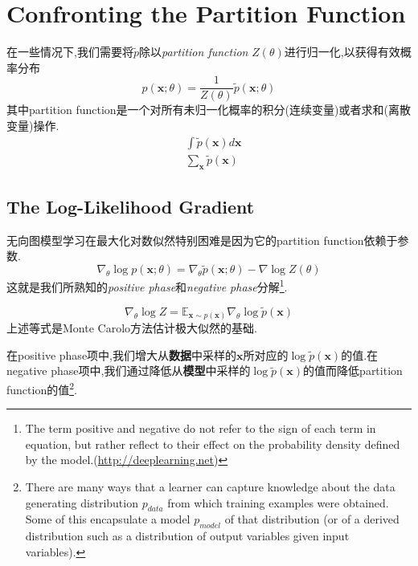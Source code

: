 \chapter{Confronting the Partition Function}

在一些情况下,我们需要将$\tilde p$除以\textit{partition function} $Z(\theta)$进行归一化,以获得有效概率分布
\begin{equation}
p(\mathbf x;\theta)=\frac{1}{Z(\theta)}\tilde p(\mathbf x;\theta)
\end{equation}
其中partition function是一个对所有未归一化概率的积分(连续变量)或者求和(离散变量)操作.
\begin{equation}\begin{split}
&\int\tilde p(\mathbf x)d\mathbf x\\
&\sum_{\mathbf x}\tilde p(\mathbf x)
\end{split}\end{equation}

\section{The Log-Likelihood Gradient}

无向图模型学习在最大化对数似然特别困难是因为它的partition function依赖于参数.
\begin{equation}
\nabla_\theta\log p(\mathbf x;\theta)=\nabla_\theta\tilde p(\mathbf x;\theta)-\nabla\log Z(\theta)
\end{equation}
这就是我们所熟知的\textit{positive phase}和\textit{negative phase}分解\footnote{The term positive and negative do not refer to the sign of each term in equation, but rather reflect to their effect on the probability density defined by the model.(\href{http://deeplearning.net/tutorial/rbm.html\#rbm}{http://deeplearning.net})}.

\begin{equation}\label{eq:gradient_of_log_partition_function}
\nabla_\theta\log Z=\mathbb E_{\mathbf x\sim p(\mathbf x)}\nabla_\theta\log\tilde p(\mathbf x)
\end{equation}
上述等式是Monte Carolo方法估计极大似然的基础.

在positive phase项中,我们增大从\textbf{数据}中采样的$\mathbf x$所对应的$\log\tilde p(\mathbf x)$的值.在negative phase项中,我们通过降低从\textbf{模型}中采样的$\log\tilde p(\mathbf x)$的值而降低partition function的值\footnote{There are many ways that a learner can capture knowledge about the data generating distribution $p_{data}$ from which training examples were obtained. Some of this encapsulate a model $p_{model}$ of that distribution (or of a derived distribution such as a distribution of output variables given input variables).}.

